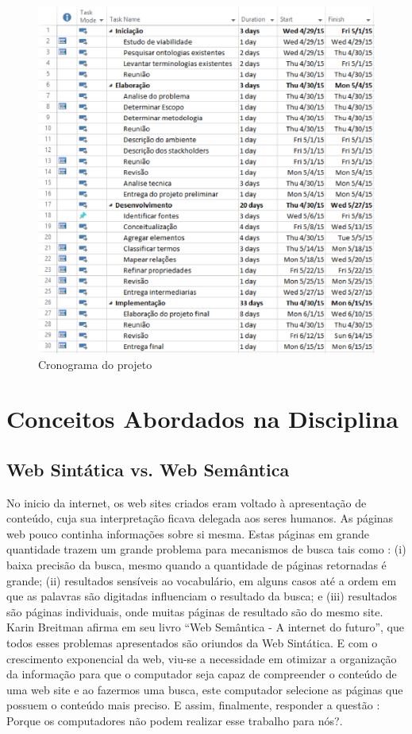  \begin{figure}[ht]
  \centering
    \includegraphics[keepaspectratio=true,scale=0.5]{figuras/cronograma.eps}
  \caption{Cronograma do projeto}
\end{figure}


\chapter{Conceitos Abordados na Disciplina}\label{cap3}

\section{Web Sintática vs. Web Semântica}

No inicio da internet, os web sites criados eram voltado à apresentação de conteúdo, cuja sua interpretação ficava delegada aos seres humanos. As páginas web pouco continha informações sobre si mesma. Estas páginas em grande quantidade trazem um grande problema para mecanismos de busca tais como : (i) baixa precisão da busca, mesmo quando a quantidade de páginas retornadas é grande; (ii) resultados sensíveis ao vocabulário, em alguns casos até a ordem em que as palavras são digitadas influenciam o resultado da busca; e (iii) resultados são páginas individuais, onde muitas páginas de resultado são do mesmo site.  Karin Breitman afirma em seu livro “Web Semântica - A internet do futuro”, que todos esses problemas apresentados são oriundos da Web Sintática. E com o crescimento exponencial da web, viu-se a necessidade em otimizar a organização da informação para que o computador seja capaz de compreender o conteúdo de uma web site e ao fazermos uma busca, este computador selecione as páginas que possuem o conteúdo mais preciso. E assim, finalmente, responder a questão : Porque os computadores não podem realizar esse trabalho para nós?.

